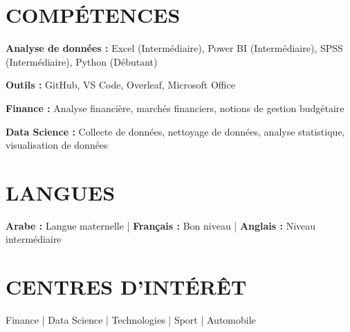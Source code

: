 \documentclass[10pt,a4paper]{article}
\begin{document}
\section{COMPÉTENCES}

\textbf{Analyse de données :}
Excel (Intermédiaire), Power BI (Intermédiaire), SPSS (Intermédiaire),
Python (Débutant)

\textbf{Outils :}
GitHub, VS Code, Overleaf, Microsoft Office

\textbf{Finance :}
Analyse financière, marchés financiers, notions de gestion budgétaire

\textbf{Data Science :}
Collecte de données, nettoyage de données, analyse statistique,
visualisation de données

\section{LANGUES}

\textbf{Arabe :} Langue maternelle
\quad | \quad
\textbf{Français :} Bon niveau
\quad | \quad
\textbf{Anglais :} Niveau intermédiaire

\section{CENTRES D'INTÉRÊT}

Finance \quad | \quad
Data Science \quad | \quad
Technologies \quad | \quad
Sport \quad | \quad
Automobile
\end{document}
